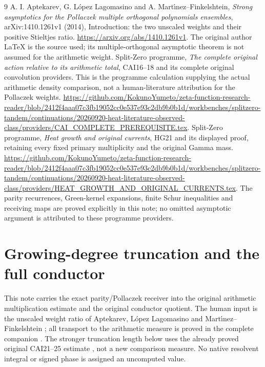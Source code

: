 \begin{thebibliography}{9}
 A. I. Aptekarev, G. L\'opez Lagomasino and
A. Mart\'{\i}nez--Finkelshtein,
\emph{Strong asymptotics for the Pollaczek multiple orthogonal
polynomials ensembles}, arXiv:1410.1261v1 (2014), Introduction:
the two unscaled weights and their positive Stieltjes ratio.
\url{https://arxiv.org/abs/1410.1261v1}.
The original author LaTeX is the source used; its multiple-orthogonal
asymptotic theorem is not assumed for the arithmetic weight.
 Split-Zero programme, \emph{The complete original
action relative to its arithmetic total}, CAI16--18 and its complete original
convolution providers. This is the programme calculation supplying
the actual arithmetic density comparison, not a human-literature
attribution for the Pollaczek weights.
\url{https://github.com/KokunoYumeto/zeta-function-research-reader/blob/2412f4aaa07c3fb19052cc0e537e93c2db9b0b1d/workbenches/splitzero-tandem/continuations/20260920-heat-literature-observed-class/providers/CAI_COMPLETE_PREREQUISITE.tex}.
 Split-Zero programme, \emph{Heat growth and original
currents}, HG21 and its displayed proof, retaining every fixed
primary multiplicity and the original Gamma mass.
\url{https://github.com/KokunoYumeto/zeta-function-research-reader/blob/2412f4aaa07c3fb19052cc0e537e93c2db9b0b1d/workbenches/splitzero-tandem/continuations/20260920-heat-literature-observed-class/providers/HEAT_GROWTH_AND_ORIGINAL_CURRENTS.tex}.
The parity recurrences, Green-kernel expansions, finite Schur
inequalities and receiving maps are proved explicitly in this note;
no omitted asymptotic argument is attributed to these programme
providers.
\end{thebibliography}


\endgroup

\clearpage\begingroup
\part*{Growing-degree truncation and the full conductor}
\newcommand{\nativecutC}{\mathbb C}
\newcommand{\nativecutR}{\mathbb R}

This note carries the exact parity/Pollaczek receiver into the original
arithmetic multiplication estimate and the original conductor quotient.
The human input is the unscaled weight ratio of Aptekarev, L\'opez
Lagomasino and Mart\'{\i}nez--Finkelshtein \cite{nativecut:ALM}; all transport to
the arithmetic measure is proved in the complete companion \cite{nativecut:PP}.
The stronger truncation length below uses the already proved original
CAI21--25 estimate \cite{nativecut:CAI}, not a new comparison measure. No native
resolvent integral or signed phase is assigned an uncomputed value.

